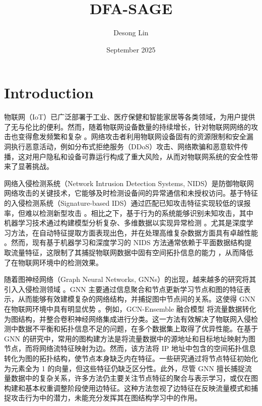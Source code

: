\documentclass{article}
\title{DFA-SAGE}
\author{Desong Lin}
\date{September 2025}
\begin{document}
\maketitle

\section{Introduction}

物联网（IoT）已广泛部署于工业、医疗保健和智能家居等各类领域，为用户提供了无与伦比的便利。然而，随着物联网设备数量的持续增长，针对物联网网络的攻击也变得愈发频繁和复杂 \cite{7123563}。网络攻击者利用物联网设备固有的资源限制和安全漏洞执行恶意活动，例如分布式拒绝服务（DDoS）攻击、网络欺骗和恶意软件传播，这对用户隐私和设备可靠运行构成了重大风险，从而对物联网系统的安全性带来了显著挑战。


网络入侵检测系统（Network Intrusion Detection Systems, NIDS）是防御物联网网络攻击的关键技术，它能够及时检测设备间的异常通信和未授权访问。基于特征的入侵检测系统（Signature-based IDS）通过匹配已知攻击特征实现较低的误报率，但难以检测新型攻击 \cite{electronics9101565}。相比之下，基于行为的系统能够识别未知攻击，其中机器学习技术通过构建模型分析复杂、多维数据以实现异常检测 \cite{Hazman2023} \cite{Al-Ambusaidi2024}。尤其是深度学习方法，在自动特征提取方面表现出色，并在处理高维复杂数据方面具有卓越性能 \cite{9796521} \cite{Hanafi2024} \cite{Saravanan2024}。然而，现有基于机器学习和深度学习的 NIDS 方法通常依赖于平面数据结构提取流量特征，这限制了其捕捉物联网数据中固有空间拓扑信息的能力 \cite{10258187}，从而降低了在物联网环境中的检测效果。

随着图神经网络（Graph Neural Networks, GNNs）的出现，越来越多的研究将其引入入侵检测领域 \cite{ZHONG2024103821}。GNN 主要通过信息聚合和节点更新学习节点和图的特征表示，从而能够有效建模复杂的网络结构，并捕捉图中节点间的关系。这使得 GNN 在物联网环境中具有明显优势 \cite{sanchez-lengeling2021a}。例如，GCN-Ensemble 融合模型 \cite{Mittal2024} 将流量数据转化为图结构，并整合卷积神经网络集成进行分类。这一方法有效解决了物联网入侵检测中数据不平衡和拓扑信息不足的问题，在多个数据集上取得了优异性能。在基于 GNN 的研究中，常用的图构建方法是将流量数据中的源地址和目标地址映射为图节点，而将网络流特征映射为边。然而，该方法将 IP 地址中包含的空间拓扑信息转化为图的拓扑结构，使节点本身缺乏内在特征。一些研究通过将节点特征初始化为元素全为 1 的向量，但这些特征仍缺乏区分性。此外，尽管 GNN 擅长捕捉流量数据中的复杂关系，许多方法仍主要关注节点特征的聚合与表示学习，或仅在图构建和基本权重调整阶段使用边特征。这种方法忽视了边特征在反映流量模式和捕捉攻击行为中的潜力，未能充分发挥其在图结构学习中的作用。
\end{document}
